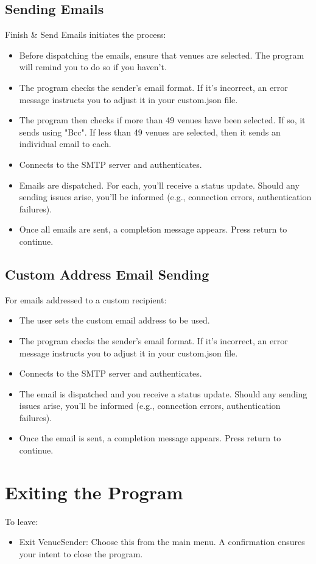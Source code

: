\documentclass{article}
\begin{document}
	\subsection*{Sending Emails}
	Finish \& Send Emails initiates the process:
	\begin{itemize}
		\item Before dispatching the emails, ensure that venues are selected. The program will remind you to do so if you haven't.
		\item The program checks the sender's email format. If it's incorrect, an error message instructs you to adjust it in your custom.json file.
		\item The program then checks if more than 49 venues have been selected. If so, it sends using "Bcc". If less than 49 venues are selected, then it sends an individual email to each.
		\item Connects to the SMTP server and authenticates.
		\item Emails are dispatched. For each, you'll receive a status update. Should any sending issues arise, you'll be informed (e.g., connection errors, authentication failures).
		\item Once all emails are sent, a completion message appears. Press return to continue.
	\end{itemize}
	
	\subsection*{Custom Address Email Sending}
	For emails addressed to a custom recipient:
	\begin{itemize}
		\item The user sets the custom email address to be used.
		\item The program checks the sender's email format. If it's incorrect, an error message instructs you to adjust it in your custom.json file.
		\item Connects to the SMTP server and authenticates.
		\item The email is dispatched and you receive a status update. Should any sending issues arise, you'll be informed (e.g., connection errors, authentication failures).
		\item Once the email is sent, a completion message appears. Press return to continue.
	\end{itemize}
	
	\section*{Exiting the Program}
	To leave:
	\begin{itemize}
		\item Exit VenueSender: Choose this from the main menu. A confirmation ensures your intent to close the program.
	\end{itemize}
	
\end{document}
